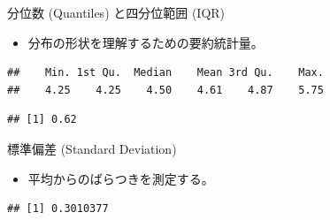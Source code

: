 \documentclass[
  ignorenonframetext,
]{beamer}
\newenvironment{Shaded}{\begin{snugshade}}{\end{snugshade}}
\newcommand{\CommentTok}[1]{\textcolor[rgb]{0.56,0.35,0.01}{\textit{#1}}}
\newcommand{\FunctionTok}[1]{\textcolor[rgb]{0.00,0.00,0.00}{#1}}
\newcommand{\NormalTok}[1]{#1}
\newcommand{\SpecialCharTok}[1]{\textcolor[rgb]{0.00,0.00,0.00}{#1}}
\newcommand{\StringTok}[1]{\textcolor[rgb]{0.31,0.60,0.02}{#1}}
\providecommand{\tightlist}{%
  \setlength{\itemsep}{0pt}\setlength{\parskip}{0pt}}
\begin{document}
\begin{frame}[fragile]{分位数 (Quantiles) と四分位範囲 (IQR)}
\protect\hypertarget{ux5206ux4f4dux6570-quantiles-ux3068ux56dbux5206ux4f4dux7bc4ux56f2-iqr}{}
\begin{itemize}
\tightlist
\item
  分布の形状を理解するための要約統計量。
\end{itemize}

\begin{Shaded}
\end{Shaded}

\begin{verbatim}
##    Min. 1st Qu.  Median    Mean 3rd Qu.    Max. 
##    4.25    4.25    4.50    4.61    4.87    5.75
\end{verbatim}

\begin{Shaded}
\end{Shaded}

\begin{verbatim}
## [1] 0.62
\end{verbatim}
\end{frame}

\begin{frame}[fragile]{標準偏差 (Standard Deviation)}
\protect\hypertarget{ux6a19ux6e96ux504fux5dee-standard-deviation}{}
\begin{itemize}
\tightlist
\item
  平均からのばらつきを測定する。
\end{itemize}

\begin{Shaded}
\end{Shaded}

\begin{verbatim}
## [1] 0.3010377
\end{verbatim}
\end{frame}
\end{document}
